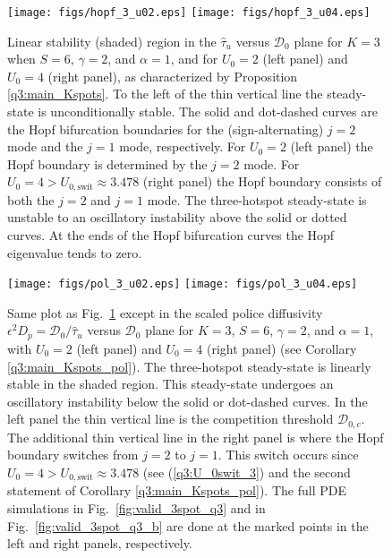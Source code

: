 \documentclass{article}%
\begin{document}
\begin{figure}[htbp]
\centering
\texttt{[image: figs/hopf\_3\_u02.eps]}
\texttt{[image: figs/hopf\_3\_u04.eps]}
\caption{\label{fig:hopf_tau_3} Linear stability (shaded) region in
  the $\hat{\tau}_u$ versus ${\mathcal D}_0$ plane for $K=3$ when
  $S=6$, $\gamma=2$, and $\alpha=1$, and for $U_0=2$ (left panel) and
  $U_{0}=4$ (right panel), as characterized by Proposition
  \ref{q3:main_Kspots}. To the left of the thin vertical line the
  steady-state is unconditionally stable. The solid and dot-dashed curves
  are the Hopf bifurcation boundaries for the (sign-alternating) $j=2$
  mode and the $j=1$ mode, respectively. For $U_0=2$ (left panel) the
  Hopf boundary is determined by the $j=2$ mode.  For
  $U_0=4>U_{0,\textrm{swit}}\approx 3.478$ (right panel) the Hopf
  boundary consists of both the $j=2$ and $j=1$ mode. The
  three-hotspot steady-state is unstable to an oscillatory instability
  above the solid or dotted curves. At the ends of the Hopf
  bifurcation curves the Hopf eigenvalue tends to zero.}
\end{figure}

\begin{figure}[htbp]
\centering
\texttt{[image: figs/pol\_3\_u02.eps]}
\texttt{[image: figs/pol\_3\_u04.eps]}
\caption{\label{fig:hopf_pol_3} Same plot as Fig.~\ref{fig:hopf_tau_3}
  except in the scaled police diffusivity $\epsilon^{2}D_p={{\mathcal
      D}_0/\hat{\tau}_u}$ versus ${\mathcal D}_0$ plane for $K=3$,
  $S=6$, $\gamma=2$, and $\alpha=1$, with $U_0=2$ (left panel) and
  $U_{0}=4$ (right panel) (see Corollary
  \ref{q3:main_Kspots_pol}). The three-hotspot steady-state is
  linearly stable in the shaded region. This steady-state undergoes an
  oscillatory instability below the solid or dot-dashed curves. In the
  left panel the thin vertical line is the competition threshold
  ${\mathcal D}_{0,c}$. The additional thin vertical line in the right
  panel is where the Hopf boundary switches from $j=2$ to $j=1$. This
  switch occurs since $U_0=4>U_{0,\textrm{swit}}\approx 3.478$ (see
  (\ref{q3:U_0swit_3}) and the second statement of Corollary
  \ref{q3:main_Kspots_pol}). The full PDE simulations in
  Fig.~\ref{fig:valid_3spot_q3} and in Fig.~\ref{fig:valid_3spot_q3_b}
  are done at the marked points in the left and right panels,
  respectively.}
\end{figure}
\end{document}
